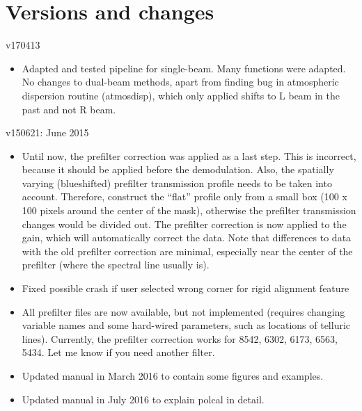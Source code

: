 \documentclass[a4paper,12pt]{article}
\begin{document}
%




\section{Versions and changes}

v170413
\begin{itemize}
\item Adapted and tested pipeline for single-beam. Many functions were adapted. No changes to dual-beam methods, apart from finding bug in atmospheric dispersion routine (atmosdisp), which only applied shifts to L beam in the past and not R beam.
\end{itemize}


v150621: June 2015
\begin{itemize}
\item Until now, the prefilter correction was applied as a last step. This is incorrect, because it should be applied before the demodulation. Also, the spatially varying (blueshifted) prefilter transmission profile needs to be taken into account. Therefore, construct the ``flat'' profile only from a small box (100 x 100 pixels around the center of the mask), otherwise the prefilter transmission changes would be divided out. The prefilter correction is now applied to the gain, which will automatically correct the data. Note that differences to data with the old prefilter correction are minimal, especially near the center of the prefilter (where the spectral line usually is).
\item Fixed possible crash if user selected wrong corner for rigid alignment feature
\item All prefilter files are now available, but not implemented (requires changing variable names and some hard-wired parameters, such as locations of telluric lines). Currently, the prefilter correction works for 8542, 6302, 6173, 6563, 5434. Let me know if you need another filter.
\item Updated manual in March 2016 to contain some figures and examples.
\item Updated manual in July 2016 to explain polcal in detail.
\end{itemize}
\end{document}
